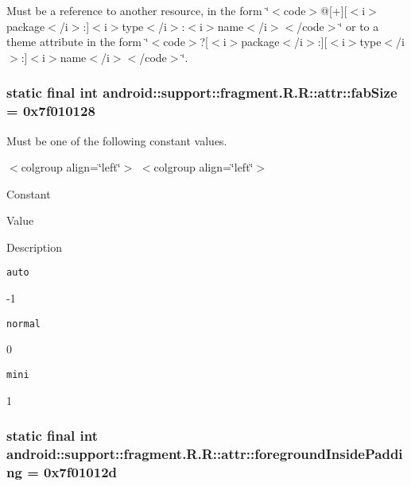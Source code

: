 Must be a reference to another resource, in the form \char`\"{}$<$code$>$@\mbox{[}+\mbox{]}\mbox{[}$<$i$>$package$<$/i$>$:\mbox{]}$<$i$>$type$<$/i$>$:$<$i$>$name$<$/i$>$$<$/code$>$\char`\"{} or to a theme attribute in the form \char`\"{}$<$code$>$?\mbox{[}$<$i$>$package$<$/i$>$:\mbox{]}\mbox{[}$<$i$>$type$<$/i$>$:\mbox{]}$<$i$>$name$<$/i$>$$<$/code$>$\char`\"{}. \hypertarget{classandroid_1_1support_1_1fragment_1_1_r_1_1attr_46eea37b64b7af65ccbea81bef8150a0}{
\subsubsection[{fabSize}]{\setlength{\rightskip}{0pt plus 5cm}static final int android::support::fragment.R.R::attr::fabSize = 0x7f010128}}
\label{classandroid_1_1support_1_1fragment_1_1_r_1_1attr_46eea37b64b7af65ccbea81bef8150a0}


Must be one of the following constant values. \begin{TabularC}{0}
\hline
\end{TabularC}
$<$colgroup align=\char`\"{}left\char`\"{}$>$ $<$colgroup align=\char`\"{}left\char`\"{}$>$ 

Constant

Value

Description 

{\tt auto}

-1

{\tt normal}

0

{\tt mini}

1\hypertarget{classandroid_1_1support_1_1fragment_1_1_r_1_1attr_471d61ee1c1c55eb359fb9b8fed9b7fa}{
\subsubsection[{foregroundInsidePadding}]{\setlength{\rightskip}{0pt plus 5cm}static final int android::support::fragment.R.R::attr::foregroundInsidePadding = 0x7f01012d}}
\label{classandroid_1_1support_1_1fragment_1_1_r_1_1attr_471d61ee1c1c55eb359fb9b8fed9b7fa}


